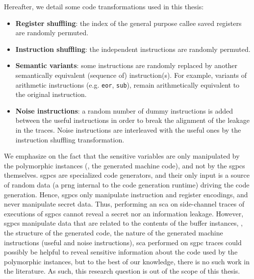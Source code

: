 Hereafter, we detail some code transformations used in this thesis:
\begin{itemize}
	\item \textbf{Register shuffling}: the index of the general purpose callee saved registers are randomly permuted.
	\item \textbf{Instruction shuffling}: the independent instructions are randomly permuted.
	\item \textbf{Semantic variants}: some instructions are randomly replaced by another semantically equivalent (sequence of) instruction(s). 
	For example, variants of arithmetic instructions (e.g. \verb+eor+, \verb+sub+), remain arithmetically equivalent to the original instruction.
	\item \textbf{Noise instructions}: a random number of dummy instructions is added between the useful instructions in order to break the alignment of the leakage in the traces. 
	Noise instructions are interleaved with the useful ones by the instruction shuffling transformation.
\end{itemize}

We emphasize on the fact that the sensitive variables are only manipulated by the polymorphic instances (\ie{}, the generated machine code), and not by the \glspl{sgpc} themselves. 
\glspl{sgpc} are specialized code generators, and their only input is a source of random data (a \gls{prng} internal to the code generation runtime) driving the code generation. 
Hence, \glspl{sgpc} only manipulate instruction and register encodings, and never manipulate secret data. 
Thus, performing an \gls{sca} on side-channel traces of executions of \glspl{sgpc} cannot reveal a secret nor an information leakage. 
However, \glspl{sgpc} manipulate data that are related to the contents of the buffer instances, \ie{}, the structure of the generated code, the nature of the generated machine instructions (useful and noise instructions), \etc{} 
\gls{sca} performed on \gls{sgpc} traces could possibly be helpful to reveal sensitive information about the code used by the polymorphic instances, but to the best of our knowledge, there is no such work in the literature. 
As such, this research question is out of the scope of this thesis.